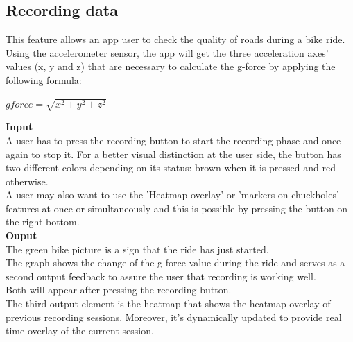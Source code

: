 \documentclass[10pt,a4paper]{article} %
\begin{document}
    \subsection{ Recording data}
    	This feature allows an app user to check the quality of roads during a bike ride.
    	Using the accelerometer sensor, the app will get the three acceleration axes' values (x, y and z) that are necessary to calculate the g-force by applying the following formula:

    
	\begin{center}
		$ gforce = \sqrt{x^2 + y^2 + z^2} $
	\end{center}
	\noindent
    \textbf{Input}\\
    A user has to press the recording button to start the recording phase and once again to stop it.
    For a better visual distinction at the user side, the button has two different colors depending on its status: brown when it is pressed and red otherwise.\\
    A user may also want to use the 'Heatmap overlay'  or 'markers on chuckholes' features at once or simultaneously and this is possible by pressing the button on the right bottom.\\
    \textbf{Ouput}\\
    The green bike picture is a sign that the ride has just started.\\
    The graph shows the change of the g-force value during the ride and serves as a second output feedback to assure the user that recording is working well.\\
    Both will appear after pressing the recording button.\\
    The third output element is the heatmap that shows the heatmap overlay of previous recording sessions. Moreover, it's dynamically updated to provide real time overlay of the current session.
    
\end{document}
